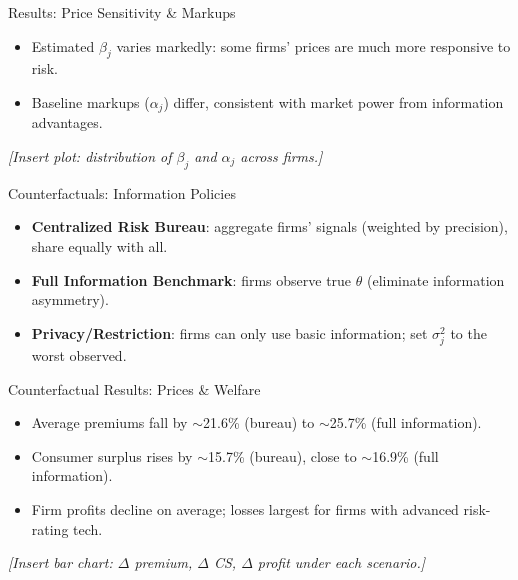 \documentclass[11pt]{beamer}
\begin{document}
\begin{frame}{Results: Price Sensitivity \& Markups}
\justifying
\begin{itemize}
  \item Estimated $\beta_j$ varies markedly: some firms’ prices are much more responsive to risk.
  \item Baseline markups ($\alpha_j$) differ, consistent with market power from information advantages.
\end{itemize}
\vspace{0.75em}
\begin{center}
\textit{[Insert plot: distribution of $\beta_j$ and $\alpha_j$ across firms.]}
\end{center}
\end{frame}

\begin{frame}{Counterfactuals: Information Policies}
\justifying
\begin{itemize}
  \item \textbf{Centralized Risk Bureau}: aggregate firms’ signals (weighted by precision), share equally with all.
  \item \textbf{Full Information Benchmark}: firms observe true $\theta$ (eliminate information asymmetry).
  \item \textbf{Privacy/Restriction}: firms can only use basic information; set $\sigma_j^2$ to the worst observed.
\end{itemize}
\end{frame}

\begin{frame}{Counterfactual Results: Prices \& Welfare}
\justifying
\begin{itemize}
  \item Average premiums fall by $\sim$21.6\% (bureau) to $\sim$25.7\% (full information).
  \item Consumer surplus rises by $\sim$15.7\% (bureau), close to $\sim$16.9\% (full information).
  \item Firm profits decline on average; losses largest for firms with advanced risk-rating tech.
\end{itemize}
\vspace{0.75em}
\begin{center}
\textit{[Insert bar chart: $\Delta$ premium, $\Delta$ CS, $\Delta$ profit under each scenario.]}
\end{center}
\end{frame}
\end{document}
